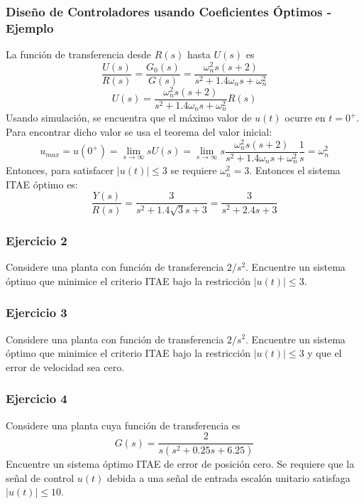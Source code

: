 \documentclass[aspectratio=169]{beamer}
\theoremstyle{definition}
\theoremstyle{plain}
\theoremstyle{remark}
\begin{document}
\begin{frame}[<+->]\frametitle{Diseño de Controladores usando Coeficientes Óptimos - Ejemplo}
La función de transferencia desde $R(s)$ hasta $U(s)$ es
\begin{equation*}
	\frac{U(s)}{R(s)} = \frac{G_0(s)}{G(s)} = \frac{\omega_n^2 s (s+2)}{s^2 + 1.4 \omega_n s + \omega_n^2}
\end{equation*}
\begin{equation*}
	U(s) = \frac{\omega_n^2 s (s+2)}{s^2 + 1.4 \omega_n s + \omega_n^2} R(s)
\end{equation*}
Usando simulación, se encuentra que el máximo valor de $u(t)$ ocurre en $t = 0^+$. Para encontrar dicho valor se usa el teorema del valor inicial:
\begin{equation*}
	u_{max} = u(0^+) = \lim_{s \rightarrow \infty} s U(s) = \lim_{s \rightarrow \infty} s \frac{\omega_n^2 s (s+2)}{s^2 + 1.4 \omega_n s + \omega_n^2} \frac{1}{s} = \omega_n^2
\end{equation*}
Entonces, para satisfacer $|u(t)| \leq 3$ se requiere $\omega_n^2 = 3$. Entonces el sistema ITAE óptimo es:
\begin{equation*}
	\frac{Y(s)}{R(s)} = \frac{3}{s^2 + 1.4 \sqrt{3} s + 3} = \frac{3}{s^2 + 2.4 s + 3} 
\end{equation*}
\end{frame}

\begin{frame}[c]\frametitle{Ejercicio 2}
Considere una planta con función de transferencia $2/s^2$. Encuentre un sistema óptimo que minimice el criterio ITAE bajo la restricción $|u(t)| \leq 3$.
\end{frame}

\begin{frame}[c]\frametitle{Ejercicio 3}
Considere una planta con función de transferencia $2/s^2$. Encuentre un sistema óptimo que minimice el criterio ITAE bajo la restricción $|u(t)| \leq 3$ y que el error de velocidad sea cero.
\end{frame}

\begin{frame}[c]\frametitle{Ejercicio 4}
Considere una planta cuya función de transferencia es
\begin{equation*}
	G(s) = \frac{2}{s(s^2 + 0.25s + 6.25)}
\end{equation*}
Encuentre un sistema óptimo ITAE de error de posición cero. Se requiere que la señal de control $u(t)$ debida a una señal de entrada escalón unitario satisfaga $|u(t)| \leq 10$.
\end{frame}
\end{document}

